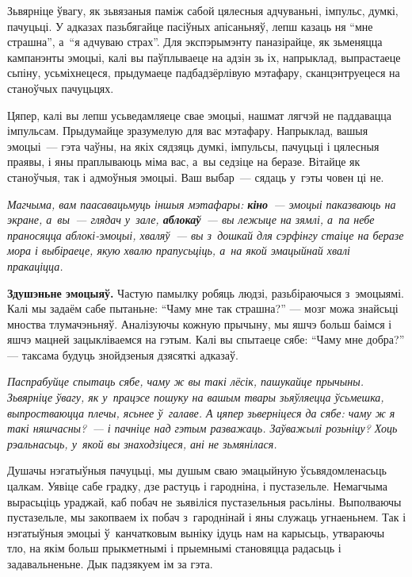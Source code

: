 Зьвярніце ўвагу, як зьвязаныя паміж сабой цялесныя адчуваньні, імпульс, думкі, пачуцьці. У адказах пазьбягайце пасіўных апісаньняў, лепш казаць ня ``мне страшна'', а~``я адчуваю страх''. Для экспэрымэнту паназірайце, як зьменяцца кампанэнты эмоцыі, калі вы паўплываеце на адзін зь іх, напрыклад, выпрастаеце сьпіну, усьміхнецеся, прыдумаеце падбадзёрлівую мэтафару, сканцэнтруецеся на станоўчых пачуцьцях.


Цяпер, калі вы лепш усьведамляеце свае эмоцыі, нашмат лягчэй не паддавацца імпульсам. Прыдумайце зразумелую для вас мэтафару. Напрыклад, вашыя эмоцыі~--- гэта чаўны, на якіх сядзяць думкі, імпульсы, пачуцьці і цялесныя праявы, і яны праплываюць міма вас, а~вы седзіце на беразе. Вітайце як станоўчыя, так і адмоўныя эмоцыі. Ваш выбар~--- сядаць у~гэты човен ці не.

\emph{Магчыма, вам паасавацьмуць іншыя мэтафары: \textbf{кіно}~--- эмоцыі паказваюць на экране, а~вы~--- глядач у~зале, \textbf{аблокаў}~--- вы лежыце на зямлі, а~па небе праносяцца аблокі-эмоцыі, хваляў~--- вы з~дошкай для сэрфінгу стаіце на беразе мора і выбіраеце, якую хвалю прапусьціць, а~на якой эмацыйнай хвалі пракаціцца.}

\textbf{Здушэньне эмоцыяў.} Частую памылку робяць людзі, разьбіраючыся з~эмоцыямі. Калі мы задаём сабе пытаньне: ``Чаму мне так страшна?'' --- мозг можа знайсьці мноства тлумачэньняў. Аналізуючы кожную прычыну, мы яшчэ больш баімся і яшчэ мацней зацыкліваемся на гэтым. Калі вы спытаеце сябе: ``Чаму мне добра?'' --- таксама будуць знойдзеныя дзясяткі адказаў.

\emph{Паспрабуйце спытаць сябе, чаму ж вы такі лёсік, пашукайце прычыны. Зьвярніце ўвагу, як у~працэсе пошуку на вашым твары зьяўляецца ўсьмешка, выпростваюцца плечы, ясьнее ў~галаве. А цяпер зьверніцеся да сябе: чаму ж я такі няшчасны?~--- і пачніце над гэтым разважаць. Заўважылі розьніцу? Хоць рэальнасьць, у~якой вы знаходзіцеся, ані не зьмянілася.}

Душачы нэгатыўныя пачуцьці, мы душым сваю эмацыйную ўсьвядомленасьць цалкам. Уявіце сабе градку, дзе растуць і гародніна, і пустазельле. Немагчыма вырасьціць ураджай, каб побач не зьявіліся пустазельныя расьліны. Выполваючы пустазельле, мы закопваем іх побач з~гароднінай і яны служаць угнаеньнем. Так і нэгатыўныя эмоцыі ў~канчатковым выніку ідуць нам на карысьць, утвараючы тло, на якім больш прыкметнымі і прыемнымі становяцца радасьць і задавальненьне. Дык падзякуем ім за гэта.

